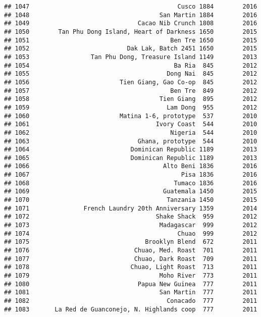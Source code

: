 \documentclass[
]{article}
\begin{document}
\begin{verbatim}
## 1047                                         Cusco 1884        2016
## 1048                                    San Martin 1884        2016
## 1049                              Cacao Nib Crunch 1808        2016
## 1050        Tan Phu Dong Island, Heart of Darkness 1650        2015
## 1051                                       Ben Tre 1650        2015
## 1052                           Dak Lak, Batch 2451 1650        2015
## 1053                 Tan Phu Dong, Treasure Island 1149        2013
## 1054                                        Ba Ria  845        2012
## 1055                                      Dong Nai  845        2012
## 1056                         Tien Giang, Gao Co-op  845        2012
## 1057                                       Ben Tre  849        2012
## 1058                                    Tien Giang  895        2012
## 1059                                      Lam Dong  955        2012
## 1060                         Matina 1-6, prototype  537        2010
## 1061                                   Ivory Coast  544        2010
## 1062                                       Nigeria  544        2010
## 1063                              Ghana, prototype  544        2010
## 1064                            Dominican Republic 1189        2013
## 1065                            Dominican Republic 1189        2013
## 1066                                     Alto Beni 1836        2016
## 1067                                          Pisa 1836        2016
## 1068                                        Tumaco 1836        2016
## 1069                                     Guatemala 1450        2015
## 1070                                      Tanzania 1450        2015
## 1071               French Laundry 20th Anniversary 1359        2014
## 1072                                   Shake Shack  959        2012
## 1073                                    Madagascar  999        2012
## 1074                                         Chuao  999        2012
## 1075                                Brooklyn Blend  672        2011
## 1076                             Chuao, Med. Roast  701        2011
## 1077                             Chuao, Dark Roast  709        2011
## 1078                            Chuao, Light Roast  713        2011
## 1079                                    Moho River  773        2011
## 1080                              Papua New Guinea  777        2011
## 1081                                    San Martin  777        2011
## 1082                                      Conacado  777        2011
## 1083       La Red de Guanconejo, N. Highlands coop  777        2011

\end{verbatim}
\end{document}
